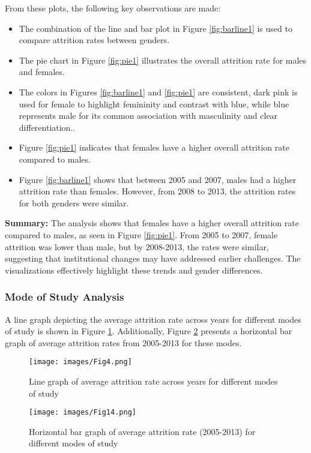 \documentclass[conference]{IEEEtran}
\begin{document}
From these plots, the following key observations are made:
\begin{itemize}
    \item The combination of the line and bar plot in Figure \ref{fig:barline1} is used to compare attrition rates between genders.
    \item The pie chart in Figure \ref{fig:pie1} illustrates the overall attrition rate for males and females.
    \item The colors in Figures \ref{fig:barline1} and \ref{fig:pie1} are consistent, dark pink is used for female to highlight femininity and contrast with blue, while blue represents male for its common association with masculinity and clear differentiation..
    \item Figure \ref{fig:pie1} indicates that females have a higher overall attrition rate compared to males.
    \item Figure \ref{fig:barline1} shows that between 2005 and 2007, males had a higher attrition rate than females. However, from 2008 to 2013, the attrition rates for both genders were similar.
\end{itemize}

\textbf{Summary:} The analysis shows that females have a higher overall attrition rate compared to males, as seen in Figure \ref{fig:pie1}. From 2005 to 2007, female attrition was lower than male, but by 2008-2013, the rates were similar, suggesting that institutional changes may have addressed earlier challenges. The visualizations effectively highlight these trends and gender differences.


\subsubsection{Mode of Study Analysis}
A line graph depicting the average attrition rate across years for different modes of study is shown in Figure \ref{fig:line1}. Additionally, Figure \ref{fig:bar2} presents a horizontal bar graph of average attrition rates from 2005-2013 for these modes.

\begin{figure}[H]
    \centering
    \texttt{[image: images/Fig4.png]}
    \caption{Line graph of average attrition rate across years for different modes of study}
    \label{fig:line1}    
\end{figure}

\begin{figure}[H]
    \centering
    \texttt{[image: images/Fig14.png]}
    \caption{Horizontal bar graph of average attrition rate (2005-2013) for different modes of study}
    \label{fig:bar2}    
\end{figure}
\end{document}
